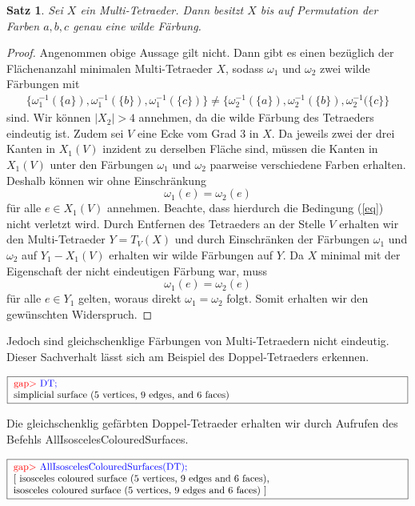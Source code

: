 \documentclass[12pt,titlepage,twoside,cleardoublepage]{article}
\newtheorem{satz}[zahl]{Satz}
\numberwithin{equation}{section}
\begin{document}
\begin{satz}
Sei $X$ ein Multi-Tetraeder. Dann besitzt $X$ bis auf Permutation der Farben $a,b,c$ genau eine wilde Färbung.
\end{satz}
\begin{proof}
Angenommen obige Aussage gilt nicht. Dann gibt es einen bezüglich der Flächenanzahl minimalen Multi-Tetraeder $X$, sodass $\omega_1$ und $\omega_2$ zwei wilde Färbungen mit 
\begin{align} \label{eq}
\{\omega_1^{-1}(\{a\}),\omega_1^{-1}(\{b\}),\omega_1^{-1}(\{c\})\}\neq \{\omega_2^{-1}(\{a\}),\omega_2^{-1}(\{b\}),\omega_2^{-1}(\{c\}\}
\end{align}
sind. Wir können $\vert X_2\vert >4$ annehmen, da die wilde Färbung des Tetraeders eindeutig ist. Zudem sei $V$ eine Ecke vom Grad 3 in $X.$ Da jeweils zwei der drei Kanten in $X_1(V)$ inzident zu derselben Fläche sind, müssen die Kanten in $X_1(V)$ unter den Färbungen $\omega_1$ und $\omega_2$ paarweise verschiedene Farben erhalten. Deshalb können wir ohne Einschränkung 
\[
\omega_1(e)=\omega_2(e)
\] 
für alle $e\in X_1(V)$ annehmen. Beachte, dass hierdurch die Bedingung (\ref{eq}) nicht verletzt wird. Durch Entfernen des Tetraeders an der Stelle $V$ erhalten wir den Multi-Tetraeder $Y=T_V(X)$ und durch Einschränken der Färbungen $\omega_1$ und $\omega_2$ auf $Y_1-X_1(V)$ erhalten wir wilde Färbungen auf $Y$. Da $X$ minimal mit der Eigenschaft der nicht eindeutigen Färbung war, muss
\[
\omega_1(e)=\omega_2(e)
\]
für alle $e\in Y_1$ gelten, woraus direkt $\omega_1=\omega_2$ folgt. Somit erhalten wir den gewünschten Widerspruch.
\end{proof}
Jedoch sind gleichschenklige Färbungen von Multi-Tetraedern nicht eindeutig. Dieser Sachverhalt lässt sich am Beispiel des Doppel-Tetraeders erkennen.
\begin{center}
$\fbox{
\parbox{14cm}{
\textcolor{red}{gap$>$} \textcolor{blue}{ DT;}\\
simplicial surface (5 vertices, 9 edges, and 6 faces)
}}$
\end{center}
Die gleichschenklig gefärbten Doppel-Tetraeder erhalten wir durch Aufrufen des Befehls 
\textsf{AllIsoscelesColouredSurfaces}.
\begin{center}
$\fbox{
\parbox{14cm}{
\textcolor{red}{gap$>$} \textcolor{blue}{AllIsoscelesColouredSurfaces(DT);}\newline
[ isosceles coloured surface (5 vertices, 9 edges and 6 faces),\newline
  isosceles coloured surface (5 vertices, 9 edges and 6 faces) ]
}}$
\end{center}
\end{document}
